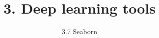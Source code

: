 \documentclass{beamer}
\title{3. Deep learning tools}
\subtitle{3.7 Seaborn}
\begin{document}
\maketitle

\begin{frame}{~}
\end{frame}
\end{document}
